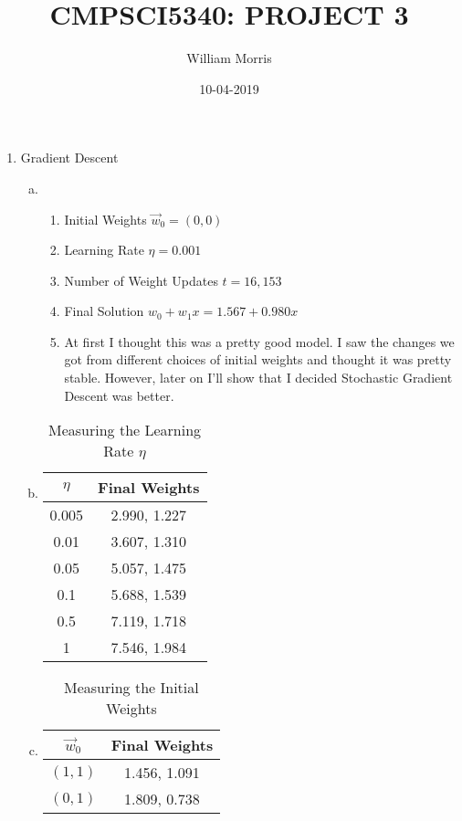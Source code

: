 \documentclass[11pt,letterpaper,oneside]{article}
\numberwithin{equation}{section}
\numberwithin{figure}{section}
\theoremstyle{definition}
\numberwithin{theorem}{section}
\begin{document}
\title{CMPSCI5340: PROJECT 3}
\author{William Morris}
\date{10-04-2019}
\maketitle

\begin{enumerate}
\item Gradient Descent
\begin{enumerate} [(a)]
\item
\begin{enumerate}
\item Initial Weights $\overrightarrow{w}_0 = (0,0)$
\item Learning Rate $\eta = 0.001$
\item Number of Weight Updates $t = 16,153$
\item Final Solution $w_0+w_1x = 1.567+0.980x$
\item At first I thought this was a pretty good model. I saw the changes we got from different choices of initial weights and thought it was pretty stable. However, later on I'll show that I decided Stochastic Gradient Descent was better.
\end{enumerate}
\item
\begin{table}[h]
\caption{Measuring the Learning Rate $\eta$}
\begin{center}
\begin{tabular}{|c|c|}
\firsthline
$\eta$&Final Weights\\\hline
0.005&2.990, 1.227\\\hline
0.01&3.607, 1.310\\\hline
0.05&5.057, 1.475\\\hline
0.1&5.688, 1.539\\\hline
0.5&7.119, 1.718\\\hline
1&7.546, 1.984\\\hline
\end{tabular}
\end{center}
\end{table}%
\item
\begin{table}[h]
\caption{Measuring the Initial Weights}
\begin{center}
\begin{tabular}{|c|c|}\firsthline
$\overrightarrow{w}_0$&Final Weights\\\hline
$(1,1)$&1.456, 1.091\\\hline
$(0,1)$&1.809, 0.738\\\hline

\end{tabular}
\end{center}
\end{table}
\end{enumerate}
\end{enumerate}
\end{document}
